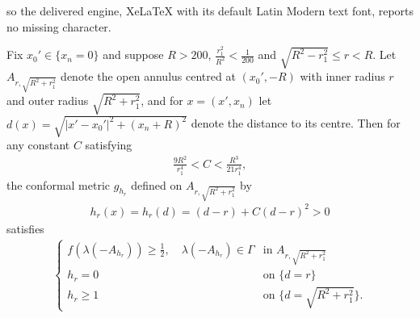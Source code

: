 \documentclass[10pt,a4paper]{amsart}
\begin{document}
so the delivered engine, XeLaTeX with its default Latin Modern text font, reports no missing character.
\begin{lem}\label{l3}
	Fix $x_0'\in\{x_n=0\}$ and suppose $R>200$, $\frac{r_1^2}{R^2} < \frac{1}{200}$ and $ \sqrt{R^2 - r_1^2} \leq r < R$. Let $A_{r, \sqrt{R^2 + r_1^2}}$ denote the open annulus centred at $(x_0', -R)$ with inner radius $r$ and outer radius $\sqrt{R^2 + r_1^2}$, and for $x = (x',x_n)$ let $d(x) = \sqrt{|x' - x_0'|^2 + (x_n + R)^2}$ denote the distance to its centre. Then for any constant $C$ satisfying
	\begin{align}\label{11}
	\frac{9R^2}{r_1^4} < C < \frac{R^3}{21r_1^4}, 
	\end{align}
	the conformal metric $g_{h_{r}}$ defined on $A_{r, \sqrt{R^2 + r_1^2}}$ by
	\begin{align*}
	h_{r}(x) = h_{r}(d) = (d-r) + C(d-r)^2 > 0 
	\end{align*}
	satisfies
	\begin{align*}
	\begin{cases}
	f(\lambda(-A_{h_{r}})) \geq \frac{1}{2}, \quad \lambda(-A_{h_r})\in\Gamma & \text{in }A_{r, \sqrt{R^2 + r_1^2}} \\
	h_{r} = 0 & \text{on }\{d=r\} \\
	h_{r} \geq 1 & \text{on }\{d=\sqrt{R^2 + r_1^2}\}. 
	\end{cases}
	\end{align*}
\end{lem}
\end{document}
